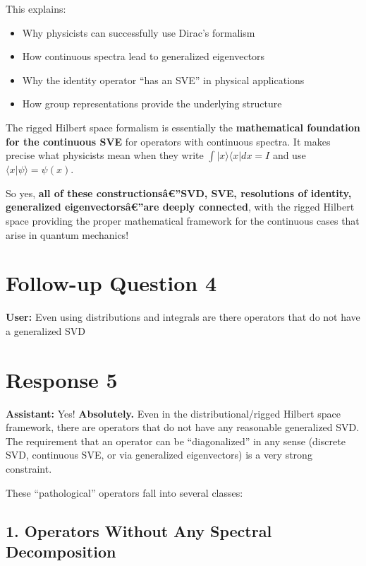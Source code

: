 \documentclass[aps,prl,reprint]{revtex4-2}
\begin{document}
This explains:

\begin{itemize}
\item Why physicists can successfully use Dirac's formalism

\item How continuous spectra lead to generalized eigenvectors

\item Why the identity operator ``has an SVE'' in physical applications

\item How group representations provide the underlying structure
\end{itemize}

The rigged Hilbert space formalism is essentially the \textbf{mathematical
foundation for the continuous SVE} for operators with continuous spectra. It
makes precise what physicists mean when they write $\int |x\rangle\langle x|
dx = I$ and use $\langle x|\psi\rangle = \psi(x)$.

So yes, \textbf{all of these constructions\^{a}\euro ''SVD, SVE, resolutions
of identity, generalized eigenvectors\^{a}\euro ''are deeply connected},
with the rigged Hilbert space providing the proper mathematical framework
for the continuous cases that arise in quantum mechanics!

\section*{Follow-up Question 4}

\textbf{User:} Even using distributions and integrals are there operators
that do not have a generalized SVD

\section*{Response 5}

\textbf{Assistant:} Yes! \textbf{Absolutely.} Even in the
distributional/rigged Hilbert space framework, there are operators that do
not have any reasonable generalized SVD. The requirement that an operator
can be ``diagonalized'' in any sense (discrete SVD, continuous SVE, or via
generalized eigenvectors) is a very strong constraint.

These ``pathological'' operators fall into several classes:

\subsection*{1. Operators Without Any Spectral Decomposition}
\end{document}

